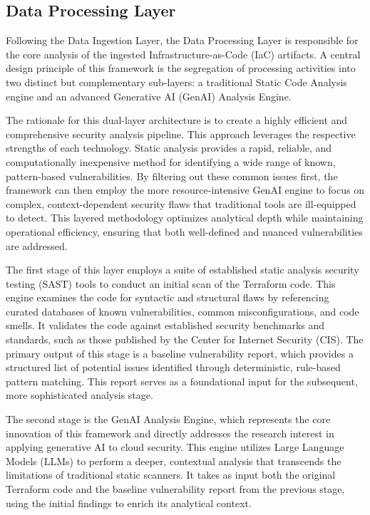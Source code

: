 
\subsection{Data Processing Layer} %
\label{sec:Data Processing Layer}

Following the Data Ingestion Layer, the Data Processing Layer is responsible for the core analysis of the ingested Infrastructure-as-Code (IaC) artifacts. A central design principle of this framework is the segregation of processing activities into two distinct but complementary sub-layers: a traditional Static Code Analysis engine and an advanced Generative AI (GenAI) Analysis Engine.

The rationale for this dual-layer architecture is to create a highly efficient and comprehensive security analysis pipeline. This approach leverages the respective strengths of each technology. Static analysis provides a rapid, reliable, and computationally inexpensive method for identifying a wide range of known, pattern-based vulnerabilities. By filtering out these common issues first, the framework can then employ the more resource-intensive GenAI engine to focus on complex, context-dependent security flaws that traditional tools are ill-equipped to detect. This layered methodology optimizes analytical depth while maintaining operational efficiency, ensuring that both well-defined and nuanced vulnerabilities are addressed.

The first stage of this layer employs a suite of established static analysis security testing (SAST) tools to conduct an initial scan of the Terraform code. This engine examines the code for syntactic and structural flaws by referencing curated databases of known vulnerabilities, common misconfigurations, and code smells. It validates the code against established security benchmarks and standards, such as those published by the Center for Internet Security (CIS). The primary output of this stage is a baseline vulnerability report, which provides a structured list of potential issues identified through deterministic, rule-based pattern matching. This report serves as a foundational input for the subsequent, more sophisticated analysis stage.

The second stage is the GenAI Analysis Engine, which represents the core innovation of this framework and directly addresses the research interest in applying generative AI to cloud security. This engine utilizes Large Language Models (LLMs) to perform a deeper, contextual analysis that transcends the limitations of traditional static scanners\cite{hayagreevan_security_2024, ling_enhancing_2024}. It takes as input both the original Terraform code and the baseline vulnerability report from the previous stage, using the initial findings to enrich its analytical context.


